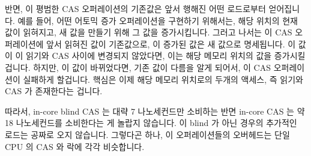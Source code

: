 \fi

반면, 이 평범한 CAS 오퍼레이션의 기존값은 앞서 행해진 어떤 로드로부터
얻어집니다.
예를 들어, 어떤 어토믹 증가 오퍼레이션을 구현하기 위해서는, 해당 위치의 현재
값이 읽혀지고, 새 값을 만들기 위해 그 값을 증가시킵니다.
그러고 나서는 이 CAS 오퍼레이션에 앞서 읽혀진 값이 기존값으로, 이 증가된 값은
새 값으로 명세됩니다.
이 값이 이 읽기와 CAS 사이에 변경되지 않았다면, 이는 해당 메모리 위치의 값을
증가시킬 겁니다.
하지만, 이 값이 바뀌었다면, 기존 값이 다름을 알게 되어서, 이 CAS 오퍼레이션이
실패하게 할겁니다.
핵심은 이제 해당 메모리 위치로의 두개의 액세스, 즉 읽기와 CAS 가 존재한다는
겁니다.

따라서, in-core blind CAS 는 대략 7 나노세컨드만 소비하는 반면 in-core CAS 는
약 18 나노세컨드를 소비한다는 게 놀랍지 않습니다.
이 blind 가 아닌 경우의 추가적인 로드는 공짜로 오지 않습니다.
그렇다곤 하나, 이 오퍼레이션들의 오버헤드는 단일 CPU 의 CAS 와 락에 각각
비슷합니다.

